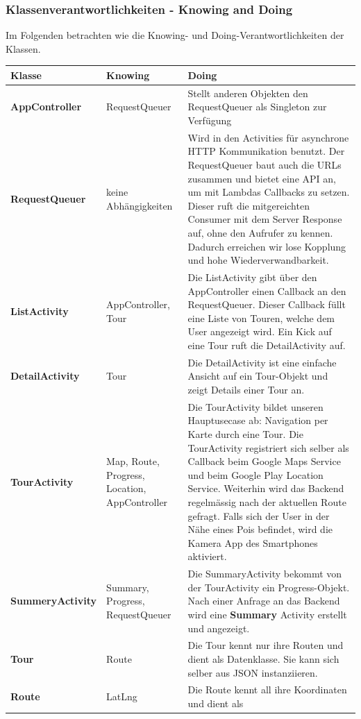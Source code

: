 \documentclass[a4paper,10pt,xetex]{article}
\begin{document}
\subsubsection{Klassenverantwortlichkeiten - Knowing and Doing}\label{knowinganddoing-frontend}
Im Folgenden betrachten wie die Knowing- und Doing-Verantwortlichkeiten der Klassen.
\begin{longtabu} to \textwidth { | l | X[2, l] | X[8, l] |  }
\hline
\textbf{Klasse} & \textbf{Knowing} & \textbf{Doing} \\\hline
\endhead
\textbf{AppController} & RequestQueuer & Stellt anderen Objekten den RequestQueuer
als Singleton zur Verfügung\\\hline
\textbf{RequestQueuer} & keine Abhängigkeiten & Wird in den Activities für asynchrone
HTTP Kommunikation benutzt. Der RequestQueuer baut auch die URLs zusammen und bietet
eine API an, um mit Lambdas Callbacks zu setzen. Dieser ruft die mitgereichten
Consumer mit dem Server Response auf, ohne den Aufrufer zu kennen. Dadurch erreichen
wir lose Kopplung und hohe Wiederverwandbarkeit. \\\hline
\textbf{ListActivity} & AppController, Tour & Die ListActivity gibt über den AppController
einen Callback an den RequestQueuer. Dieser Callback füllt eine Liste von Touren,
welche dem User angezeigt wird. Ein Kick auf eine Tour ruft die DetailActivity auf.
\\\hline
\textbf{DetailActivity} & Tour & Die DetailActivity ist eine einfache Ansicht auf
ein Tour-Objekt und zeigt Details einer Tour an.\\\hline
\textbf{TourActivity} & Map, Route, Progress, Location, AppController & Die TourActivity bildet
unseren Hauptusecase ab: Navigation per Karte durch eine Tour. Die TourActivity
registriert sich selber als Callback beim Google Maps Service und beim Google
Play Location Service. Weiterhin wird das Backend regelmässig nach der aktuellen
Route gefragt. Falls sich der User in der Nähe eines Pois befindet, wird die
Kamera App des Smartphones aktiviert.\\\hline
\textbf{SummeryActivity} & Summary, Progress, RequestQueuer & Die SummaryActivity
bekommt von der TourActivity ein Progress-Objekt. Nach einer Anfrage an das
Backend wird eine \textbf{Summary} Activity erstellt und angezeigt.\\\hline
\textbf{Tour} & Route & Die Tour kennt nur ihre Routen und dient als Datenklasse.
Sie kann sich selber aus JSON instanziieren.\\\hline
\textbf{Route} & LatLng & Die Route kennt all ihre Koordinaten und dient als

\end{longtabu}
\end{document}
